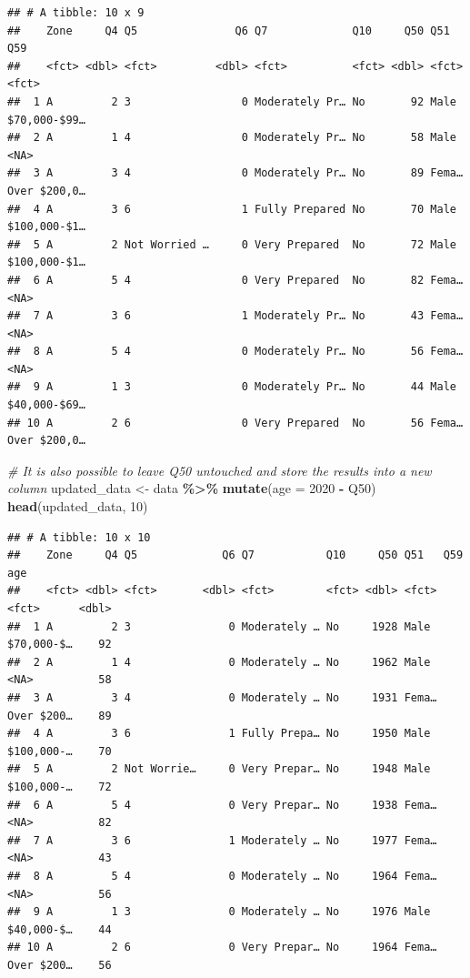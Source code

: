 \documentclass[
]{book}
\newenvironment{Shaded}{\begin{snugshade}}{\end{snugshade}}
\newcommand{\CommentTok}[1]{\textcolor[rgb]{0.56,0.35,0.01}{\textit{#1}}}
\newcommand{\DataTypeTok}[1]{\textcolor[rgb]{0.13,0.29,0.53}{#1}}
\newcommand{\DecValTok}[1]{\textcolor[rgb]{0.00,0.00,0.81}{#1}}
\newcommand{\KeywordTok}[1]{\textcolor[rgb]{0.13,0.29,0.53}{\textbf{#1}}}
\newcommand{\NormalTok}[1]{#1}
\newcommand{\OperatorTok}[1]{\textcolor[rgb]{0.81,0.36,0.00}{\textbf{#1}}}
\newcommand{\StringTok}[1]{\textcolor[rgb]{0.31,0.60,0.02}{#1}}
\begin{document}
\begin{verbatim}
## # A tibble: 10 x 9
##    Zone     Q4 Q5               Q6 Q7             Q10     Q50 Q51   Q59         
##    <fct> <dbl> <fct>         <dbl> <fct>          <fct> <dbl> <fct> <fct>       
##  1 A         2 3                 0 Moderately Pr… No       92 Male  $70,000-$99…
##  2 A         1 4                 0 Moderately Pr… No       58 Male  <NA>        
##  3 A         3 4                 0 Moderately Pr… No       89 Fema… Over $200,0…
##  4 A         3 6                 1 Fully Prepared No       70 Male  $100,000-$1…
##  5 A         2 Not Worried …     0 Very Prepared  No       72 Male  $100,000-$1…
##  6 A         5 4                 0 Very Prepared  No       82 Fema… <NA>        
##  7 A         3 6                 1 Moderately Pr… No       43 Fema… <NA>        
##  8 A         5 4                 0 Moderately Pr… No       56 Fema… <NA>        
##  9 A         1 3                 0 Moderately Pr… No       44 Male  $40,000-$69…
## 10 A         2 6                 0 Very Prepared  No       56 Fema… Over $200,0…
\end{verbatim}

\begin{Shaded}
\begin{Highlighting}[]
\CommentTok{\# It is also possible to leave Q50 untouched and store the results into a new column}
\NormalTok{updated\_data \textless{}{-}}\StringTok{ }\NormalTok{data }\OperatorTok{\%\textgreater{}\%}\StringTok{ }\KeywordTok{mutate}\NormalTok{(}\DataTypeTok{age =} \DecValTok{2020} \OperatorTok{{-}}\StringTok{ }\NormalTok{Q50)}
\KeywordTok{head}\NormalTok{(updated\_data, }\DecValTok{10}\NormalTok{)}
\end{Highlighting}
\end{Shaded}

\begin{verbatim}
## # A tibble: 10 x 10
##    Zone     Q4 Q5             Q6 Q7           Q10     Q50 Q51   Q59          age
##    <fct> <dbl> <fct>       <dbl> <fct>        <fct> <dbl> <fct> <fct>      <dbl>
##  1 A         2 3               0 Moderately … No     1928 Male  $70,000-$…    92
##  2 A         1 4               0 Moderately … No     1962 Male  <NA>          58
##  3 A         3 4               0 Moderately … No     1931 Fema… Over $200…    89
##  4 A         3 6               1 Fully Prepa… No     1950 Male  $100,000-…    70
##  5 A         2 Not Worrie…     0 Very Prepar… No     1948 Male  $100,000-…    72
##  6 A         5 4               0 Very Prepar… No     1938 Fema… <NA>          82
##  7 A         3 6               1 Moderately … No     1977 Fema… <NA>          43
##  8 A         5 4               0 Moderately … No     1964 Fema… <NA>          56
##  9 A         1 3               0 Moderately … No     1976 Male  $40,000-$…    44
## 10 A         2 6               0 Very Prepar… No     1964 Fema… Over $200…    56
\end{verbatim}
\end{document}
